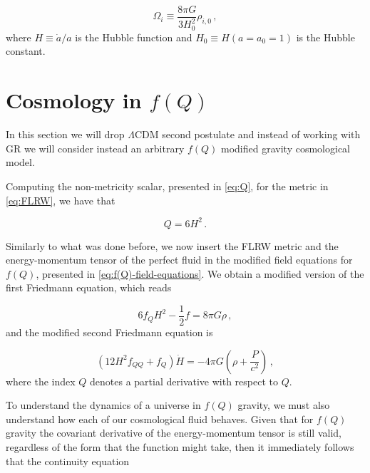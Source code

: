 \begin{equation}
    \label{eq:densities}
    \Omega_i \equiv \frac{8 \pi G}{3H_0^2} \rho_{i,0} \,,
\end{equation}
where $H \equiv \dot{a}/a$ is the Hubble function and $H_0 \equiv H(a = a_0 = 1)$ is the Hubble constant.


\section{Cosmology in $f(Q)$}

In this section we will drop $\Lambda$CDM second postulate and instead of working with \gls{GR} we will consider instead an arbitrary $f(Q)$ modified gravity cosmological model.

Computing the non-metricity scalar, presented in \cref{eq:Q}, for the metric in \cref{eq:FLRW}, we have  that \cite{Jimenez2019}

\begin{equation}
    \label{eq:Q=6H2}
    Q = 6H^2 \,.
\end{equation}

Similarly to what was done before, we now insert the \gls{FLRW} metric and the energy-momentum tensor of the perfect fluid in the modified field equations for $f(Q)$, presented in \cref{eq:f(Q)-field-equations}. We obtain a modified version of the first Friedmann equation, which reads \cite{Jimenez2017}

\begin{equation}
    \label{eq:STG-friedmann-1}
    6 f_Q H^2 - \frac{1}{2}f = 8 \pi G \rho \,,
\end{equation}
and the modified second Friedmann equation is

\begin{equation}
    \label{eq:STG-friedmann-2}
    (12H^2 f_{QQ} + f_Q) \dot{H} = - 4 \pi G \left(\rho + \frac{P}{c^2} \right) \,,
\end{equation}
where the index $Q$ denotes a partial derivative with respect to $Q$.

To understand the dynamics of a universe in $f(Q)$ gravity, we must also understand how each of our cosmological fluid behaves. Given that for $f(Q)$ gravity the covariant derivative of the energy-momentum tensor is still valid, regardless of the form that the function might take, then it immediately follows that the continuity equation

